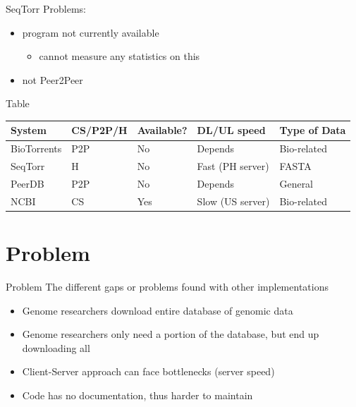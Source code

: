 \documentclass{beamer}
\begin{document}
    
    \begin{frame}{SeqTorr}
        Problems:
        \begin{itemize}
            \item program not currently available
            \begin{itemize}
                \item cannot measure any statistics on this
            \end{itemize}
            \item not Peer2Peer
        \end{itemize}
    \end{frame}
    
    \begin{frame}{Table}
   \begin{table}[]
\begin{tabular}{|l|l|l|l|l|}
\hline
System      & CS/P2P/H & Available? & DL/UL speed & Type of Data \\ \hline
BioTorrents & P2P           & No         & Depends                    & Bio-related  \\ \hline
SeqTorr     & H             & No         & Fast (PH server)           & FASTA        \\ \hline
PeerDB      & P2P           & No         & Depends                    & General      \\ \hline
NCBI        & CS            & Yes        & Slow (US server)           & Bio-related  \\ \hline
\end{tabular}
\end{table} 
    \end{frame}



\section{Problem}
\begin{frame}{Problem}
The different gaps or problems found with other implementations

\begin{itemize}
    \item Genome researchers download entire database of genomic data
    \item Genome researchers only need a portion of the database, but end up downloading all
    \item Client-Server approach can face bottlenecks (server speed)
    \item Code has no documentation, thus harder to maintain

\end{itemize}
\end{frame}
\end{document}
